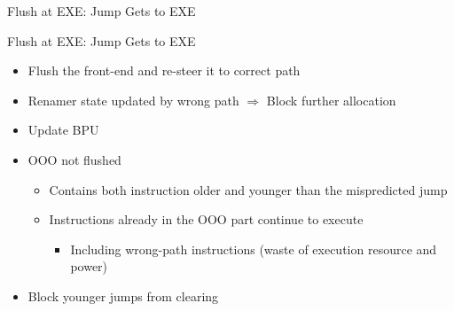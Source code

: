 \documentclass[aspectratio=169,12pt]{beamer}
\begin{document}
\begin{frame}{Flush at EXE: Jump Gets to EXE}
    \centering
    
    \vspace{4cm} %
\end{frame}

\begin{frame}{Flush at EXE: Jump Gets to EXE}
    \vspace{1cm}
    \centering
    
    
    \vspace{0.5cm}
    \begin{itemize}
        \item Flush the front-end and re-steer it to correct path
        \item Renamer state updated by wrong path $\Rightarrow$ Block further allocation
        \item Update BPU
        \item OOO not flushed
        \begin{itemize}
            \item Contains both instruction older and younger than the mispredicted jump
            \item Instructions already in the OOO part continue to execute
            \begin{itemize}
                \item Including wrong-path instructions (waste of execution resource and power)
            \end{itemize}
        \end{itemize}
        \item Block younger jumps from clearing
    \end{itemize}
\end{frame}
\end{document}
